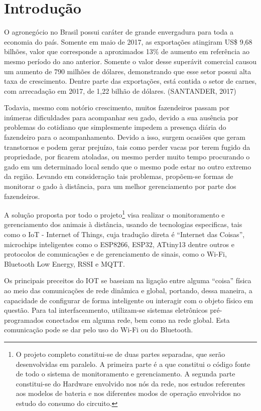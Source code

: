 \newpage
\section{Introdução}
\label{sc:Introducao_}


{
\onehalfspacing
O agronegócio no Brasil possui caráter de grande envergadura para toda a economia do país. Somente em maio de 2017, as exportações atingiram US\$ 9,68 bilhões, valor que corresponde a aproximados 13\% de aumento em referência ao mesmo período do ano anterior. Somente o valor desse superávit comercial causou um aumento de 790 milhões de dólares, demonstrando que esse setor possui alta taxa de crescimento. Dentre parte das exportações, está contida o setor de carnes, com arrecadação em 2017, de 1,22 bilhão de dólares. (SANTANDER, 2017)
}

{
Todavia, mesmo com notório crescimento, muitos fazendeiros passam por inúmeras dificuldades para acompanhar seu gado, devido a sua ausência por problemas do cotidiano que simplesmente impedem a presença diária do fazendeiro para o acompanhamento. Devido a isso, surgem ocasiões que geram transtornos e podem gerar prejuízo, tais como perder vacas por terem fugido da propriedade, por ficarem atoladas, ou mesmo perder muito tempo procurando o gado em um determinado local sendo que o mesmo pode estar no outro extremo da região. Levando em consideração tais problemas, propõem-se formas de monitorar o gado à distância, para um melhor gerenciamento por parte dos fazendeiros.
}

{
A solução proposta por todo o projeto\footnote{O projeto completo constitui-se de duas partes separadas, que serão desenvolvidas em paralelo. A primeira parte é a que constitui o código fonte de todo o sistema de monitoramento e gerenciamento. A segunda parte constitui-se do Hardware envolvido nos nós da rede, nos estudos referentes aos modelos de bateria e nos diferentes modos de operação envolvidos no estudo do consumo do circuito.} visa realizar o monitoramento e gerenciamento dos animais à distância, usando de tecnologias especificas, tais como o IoT - Internet of Things, cuja tradução direta é “Internet das Coisas”, microchips inteligentes como o ESP8266, ESP32, ATtiny13 dentre outros e protocolos de comunicações e de gerenciamento de sinais, como o Wi-Fi, Bluetooth Low Energy, RSSI e MQTT.
}

{
Os principais preceitos do IOT se baseiam na ligação entre alguma “coisa” física ao meio das comunicações de rede dinâmica e global, portando, dessa maneira, a capacidade de configurar de forma inteligente ou interagir com o objeto físico em questão. Para tal interfaceamento, utilizam-se sistemas eletrônicos pré-programados conectados em alguma rede, bem como na rede global. Esta comunicação pode se dar pelo uso do Wi-Fi ou do Bluetooth.
}

